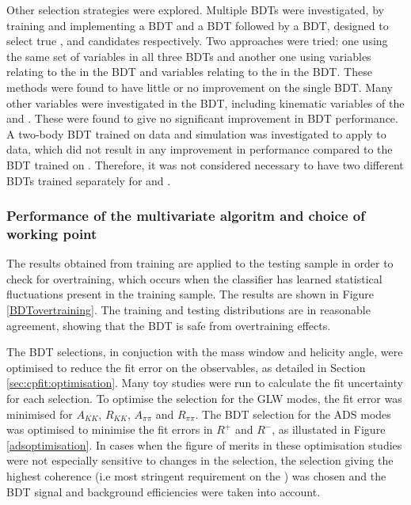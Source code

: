Other selection strategies were explored. Multiple BDTs were investigated, by training and implementing a \KS BDT and a \Dz BDT followed by a \B BDT, designed to select true \KS, \Dz and \B candidates respectively. Two approaches were tried: one using the same set of variables in all three BDTs and another one using variables relating to the \KS in the \KS BDT and variables relating to the \Dz in the \Dz BDT. These methods were found to have little or no improvement on the single BDT. Many other variables were investigated in the BDT, including kinematic variables of the \B and \D. These were found to give no significant improvement in BDT performance. A two-body BDT trained on \runtwo data and simulation was investigated to apply to \runtwo data, which did not result in any improvement in performance compared to the BDT trained on \runone. Therefore, it was not considered necessary to have two different BDTs trained separately for \runone and \runtwo.

\subsubsection{Performance of the multivariate algoritm and choice of working point}

The results obtained from training are applied to the testing sample in order to check for overtraining, which occurs when the classifier has learned statistical fluctuations present in the training sample. The results are shown in Figure \ref{BDTovertraining}. The training and testing distributions are in reasonable agreement, showing that the BDT is safe from overtraining effects.

The BDT selections, in conjuction with the \Kstarm mass window and \KS helicity angle, were optimised to reduce the fit error on the \CP observables, as detailed in Section \ref{sec:cpfit:optimisation}. Many toy studies were run to calculate the fit uncertainty for each selection. To optimise the selection for the GLW modes, the fit error was minimised for $A_{KK}$, $R_{KK}$, $A_{\pi\pi}$ and $R_{\pi\pi}$. The BDT selection for the ADS modes was optimised to minimise the fit errors in $R^+$ and $R^-$, as illustated in Figure \ref{adsoptimisation}. In cases when the figure of merits in these optimisation studies were not especially sensitive to changes in the selection, the selection giving the highest coherence (i.e most stringent requirement on the \Kstarm) was chosen and the BDT signal and background efficiencies were taken into account.

